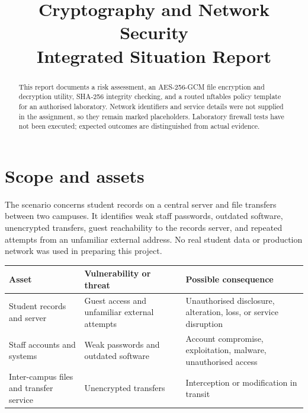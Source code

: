 \documentclass[11pt,a4paper]{article}
\title{Cryptography and Network Security\\Integrated Situation Report}
\begin{document}
\maketitle

\begin{abstract}
This report documents a risk assessment, an AES-256-GCM file encryption and decryption utility, SHA-256 integrity checking, and a routed nftables policy template for an authorised laboratory. Network identifiers and service details were not supplied in the assignment, so they remain marked placeholders. Laboratory firewall tests have not been executed; expected outcomes are distinguished from actual evidence.
\end{abstract}

\section{Scope and assets}
The scenario concerns student records on a central server and file transfers between two campuses. It identifies weak staff passwords, outdated software, unencrypted transfers, guest reachability to the records server, and repeated attempts from an unfamiliar external address. No real student data or production network was used in preparing this project.

\begin{tabularx}{\textwidth}{>{\raggedright\arraybackslash}p{}XX}
\toprule
Asset & Vulnerability or threat & Possible consequence\\
\midrule
Student records and server & Guest access and unfamiliar external attempts & Unauthorised disclosure, alteration, loss, or service disruption\\
Staff accounts and systems & Weak passwords and outdated software & Account compromise, exploitation, malware, unauthorised access\\
Inter-campus files and transfer service & Unencrypted transfers & Interception or modification in transit\\
\bottomrule
\end{tabularx}
\end{document}
